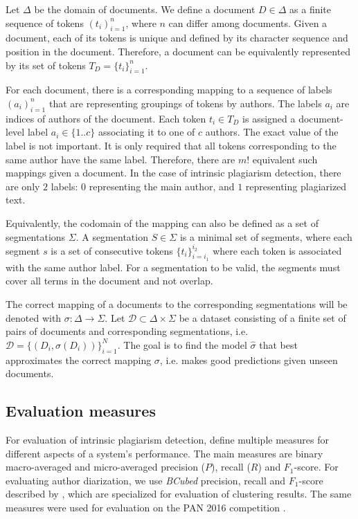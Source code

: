 \documentclass[10pt, a4paper]{article}
\begin{document}
Let $\Delta$ be the domain of documents. We define a document $D\in \Delta$ as a finite sequence of tokens $(t_i)_{i=1}^n$, where $n$ can differ among documents. Given a document, each of its tokens is unique and defined by its character sequence and position in the document. Therefore, a document can be equivalently represented by its set of tokens $T_D=\{t_i\}_{i=1}^n$.

For each document, there is a corresponding mapping to a sequence of labels $(a_i)_{i=1}^n$ that are representing groupings of tokens by authors. The labels $a_i$ are indices of authors of the document. Each token $t_i\in T_D$ is assigned a document-level label $a_i \in \{1..c\}$ associating it to one of $c$ authors. The exact value of the label is not important. It is only required that all tokens corresponding to the same author have the same label. Therefore, there are $m!$ equivalent such mappings given a document. In the case of intrinsic plagiarism detection, there are only $2$ labels: $0$ representing the main author, and $1$ representing plagiarized text.

Equivalently, the codomain of the mapping can also be defined as a set of segmentations $\Sigma$. A segmentation $S\in \Sigma$ is a minimal set of segments, where each segment $s$ is a set of consecutive tokens $\{t_i\}_{i=i_1}^{i_2}$ where each token is associated with the same author label. For a segmentation to be valid, the segments must cover all terms in the document and not overlap.

The correct mapping of a documents to the corresponding segmentations will be denoted with $\sigma: \Delta\rightarrow\Sigma$. Let $\mathcal{D} \subset \Delta\times\Sigma$ be a dataset consisting of a finite set of pairs of documents and corresponding segmentations, i.e. $\mathcal{D} = \{\left(D_i, \sigma(D_i)\right)\}_{i=1}^N$. The goal is to find the model $\hat{\sigma}$ that best approximates the correct mapping $\sigma$, i.e. makes good predictions given unseen documents.

\subsection{Evaluation measures} \label{subsec:evaluation-measures}

For evaluation of intrinsic plagiarism detection, \citet{stein-2010} define multiple measures for different aspects of a system's performance. The main measures are binary macro-averaged and micro-averaged precision ($P$), recall ($R$) and $F_1$-score. For evaluating author diarization, we use \emph{BCubed} precision, recall and $F_1$-score described by \citet{amigo-2009}, which are specialized for evaluation of clustering results. The same measures were used for evaluation on the PAN 2016 competition \citep{rosso-2016}.
\end{document}
